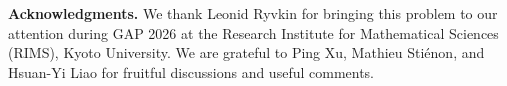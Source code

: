 \documentclass[12pt,reqno]{amsart}
\theoremstyle{definition}
\theoremstyle{remark}
\begin{document}
\vspace{20pt}  

\noindent \textbf{Acknowledgments.} We thank Leonid Ryvkin for bringing this problem to our attention
during GAP 2026 at the Research Institute for Mathematical Sciences
(RIMS), Kyoto University. We are grateful to Ping Xu, Mathieu Sti\'{e}non, and Hsuan-Yi Liao  for fruitful discussions and useful comments.



 




\end{document}

